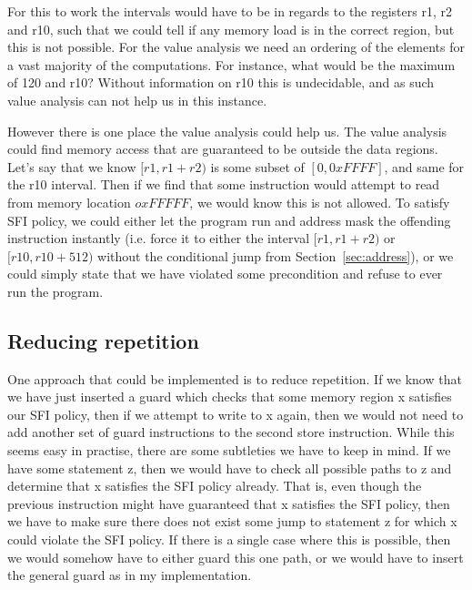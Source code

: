 For this to work the intervals would have to be in regards to the registers r1,
r2 and r10, such that we could tell if any memory load is in the correct
region, but this is not possible. For the value analysis we need an ordering of
the elements for a vast majority of the computations. For instance, what would
be the maximum of 120 and r10? Without information on r10 this is undecidable,
and as such value analysis can not help us in this instance.

However there is one place the value analysis could help us. The value analysis
could find memory access that are guaranteed to be outside the data regions.
Let's say that we know $[r1,r1 + r2)$ is some subset of $[0, 0xFFFF]$, and same
for the r10 interval. Then if we find that some instruction would attempt to
read from memory location $oxFFFFF$, we would know this is not allowed. To
satisfy SFI policy, we could either let the program run and address mask the
offending instruction instantly (i.e. force it to either the interval $[r1,
r1+r2)$ or $[r10, r10+512)$ without the conditional jump from
Section~\ref{sec:address}), or we could simply state that we have violated some
precondition and refuse to ever run the program. 

\subsection{Reducing repetition} 
One approach that could be implemented is to reduce repetition. If we know that
we have just inserted a guard which checks that some memory region x satisfies
our SFI policy, then if we attempt to write to x again, then we would not need
to add another set of guard instructions to the second store instruction. While
this seems easy in practise, there are some subtleties we have to keep in mind.
If we have some statement z, then we would have to check all possible paths to
z and determine that x satisfies the SFI policy already. That is, even though
the previous instruction might have guaranteed that x satisfies the SFI policy,
then we have to make sure there does not exist some jump to statement z for
which x could violate the SFI policy. If there is a single case where this is
possible, then we would somehow have to either guard this one path, or we would
have to insert the general guard as in my implementation. 

